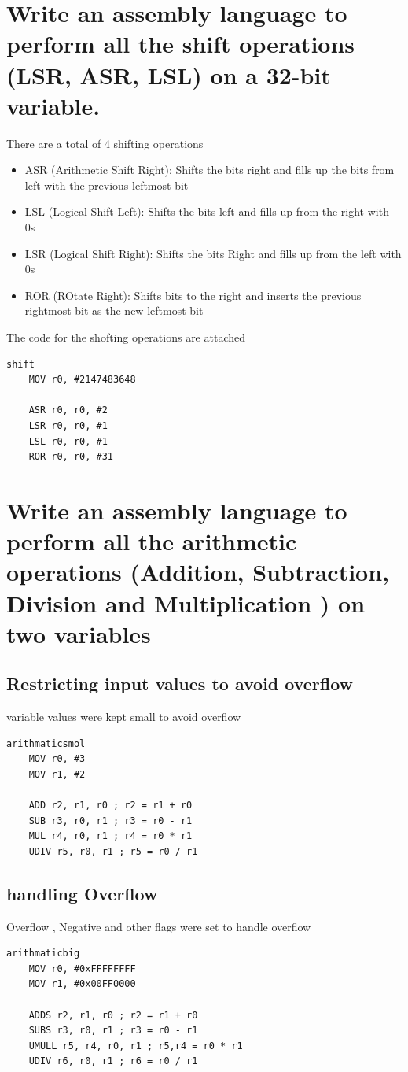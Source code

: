 \documentclass{article}
\begin{document}
\section{Write an assembly language to perform all the shift operations (LSR, ASR, LSL) on a 32-bit variable.}
    There are a total of 4 shifting operations
    \begin{itemize}
        \item ASR (Arithmetic Shift Right): Shifts the bits right and fills up the bits from left with the previous leftmost bit
        \item LSL (Logical Shift Left): Shifts the bits left and fills up from the right with 0s 
        \item LSR (Logical Shift Right): Shifts the bits Right and fills up from the left with 0s 
        \item ROR (ROtate Right): Shifts bits to the right and inserts the previous rightmost bit as the new leftmost bit
    \end{itemize}
    The code for the shofting operations are attached
    \begin{verbatim}
shift	
    MOV r0, #2147483648 
    	
    ASR r0, r0, #2	
    LSR r0, r0, #1	
    LSL r0, r0, #1	
    ROR r0, r0, #31	
    \end{verbatim}

\section{Write an assembly language to perform all the arithmetic operations (Addition, Subtraction, Division and Multiplication ) on two
variables}
    \subsection{Restricting input values to avoid overflow}
        variable values were kept small to avoid overflow
        \begin{verbatim}
arithmaticsmol	
    MOV r0, #3
    MOV r1, #2
    
    ADD r2, r1, r0 ; r2 = r1 + r0
    SUB r3, r0, r1 ; r3 = r0 - r1
    MUL r4, r0, r1 ; r4 = r0 * r1
    UDIV r5, r0, r1 ; r5 = r0 / r1
        \end{verbatim}
    \subsection{handling Overflow}
        Overflow , Negative and other flags were set to handle overflow
        \begin{verbatim}
arithmaticbig	
    MOV r0, #0xFFFFFFFF
    MOV r1, #0x00FF0000
    
    ADDS r2, r1, r0 ; r2 = r1 + r0
    SUBS r3, r0, r1 ; r3 = r0 - r1
    UMULL r5, r4, r0, r1 ; r5,r4 = r0 * r1
    UDIV r6, r0, r1 ; r6 = r0 / r1
        \end{verbatim}
\end{document}
